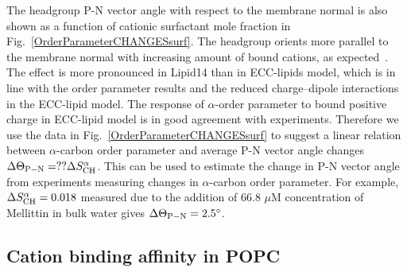 \documentclass[aip,jcp,twocolumn]{revtex4}
\begin{document}
The headgroup P-N vector angle with respect to the membrane normal
is also shown as a function of cationic surfactant mole fraction
in Fig.~\ref{OrderParameterCHANGESsurf}.
The headgroup orients more parallel to the membrane
normal with increasing amount of bound cations, as expected~\cite{seelig87}. 
The effect is more pronounced in Lipid14 than 
in ECC-lipids model, which is in line with the order parameter 
results and the reduced charge--dipole interactions in the ECC-lipid model.
The response of $\alpha$-order parameter to bound positive charge
in ECC-lipid model is in good agreement with experiments.
Therefore we use the data in Fig.~\ref{OrderParameterCHANGESsurf}
to suggest a linear relation between $\alpha$-carbon order parameter
and average P-N vector angle changes $\Delta \Theta_{\rm P-N}=?? \Delta S_{\rm CH}^{\alpha}$.
This can be used to estimate the change in P-N vector angle
from experiments measuring changes in $\alpha$-carbon order parameter. 
For example, $\Delta S_{\rm CH}^{\alpha}=0.018$ measured due to the
addition of 66.8 $\mu$M concentration of Mellittin in bulk water \cite{kuchinka89}
gives $\Delta \Theta_{\rm P-N} = 2.5^{\circ}$.


\subsection{Cation binding affinity in POPC}
\end{document}
